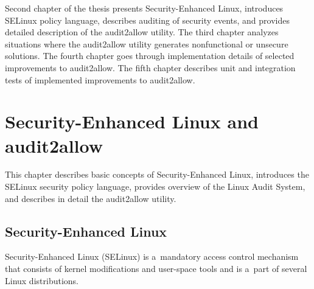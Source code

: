 Second chapter of the thesis presents Security-Enhanced Linux, introduces
SELinux policy language, describes auditing of security events, and provides
detailed description of the audit2allow utility. The third chapter analyzes
situations where the audit2allow utility generates nonfunctional or unsecure
solutions. The fourth chapter goes through implementation details of selected
improvements to audit2allow. The fifth chapter describes unit and integration
tests of implemented improvements to audit2allow.

\chapter{Security-Enhanced Linux and audit2allow}

This chapter describes basic concepts of Security-Enhanced Linux, introduces the
SELinux security policy language, provides overview of the Linux Audit System,
and describes in detail the audit2allow utility.

\section{Security-Enhanced Linux}
Security-Enhanced Linux (SELinux) is a~mandatory access control mechanism that
consists of kernel modifications and user-space tools and is a~part of several
Linux distributions.

